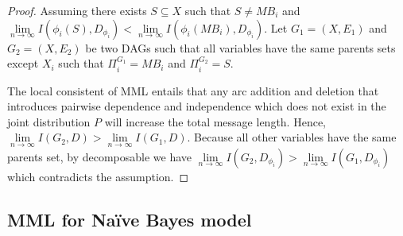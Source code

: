 \begin{proof}
Assuming there exists $S \subseteq X$ such that $S \neq MB_i$ and $\lim\limits_{n\rightarrow \infty}I(\phi_i(S), D_{\phi_i}) < \lim\limits_{n\rightarrow \infty}I(\phi_i(MB_i), D_{\phi_i})$. Let $G_1=(X,E_1)$ and $G_2=(X,E_2)$ be two DAGs such that all variables have the same parents sets except $X_i$ such that $\Pi_i^{G_1} = MB_i$ and $\Pi_i^{G_2} = S$. 

The local consistent of MML entails that any arc addition and deletion that introduces pairwise dependence and independence which does not exist in the joint distribution $P$ will increase the total message length. Hence, $\lim\limits_{n\rightarrow \infty}I(G_2, D) > \lim\limits_{n\rightarrow \infty}I(G_1, D)$. Because all other variables have the same parents set, by decomposable we have $\lim\limits_{n\rightarrow \infty}I(G_2, D_{\phi_i}) > \lim\limits_{n\rightarrow \infty}I(G_1, D_{\phi_i})$ which contradicts the assumption. \qedwhite
\end{proof}


\subsection{MML for Na\"ive Bayes model}

